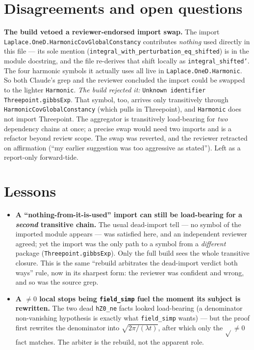 \documentclass[11pt]{article}
\begin{document}
\section{Disagreements and open questions}
\textbf{The build vetoed a reviewer-endorsed import swap.} The import
\texttt{Laplace.OneD.HarmonicCovGlobalConstancy} contributes \emph{nothing} used directly in this file
--- its sole mention (\texttt{integral\_with\_perturbation\_eq\_shifted}) is in the module docstring,
and the file re-derives that shift locally as \texttt{integral\_shifted'}. The four harmonic symbols
it actually uses all live in \texttt{Laplace.OneD.Harmonic}. So both Claude's grep and the reviewer
concluded the import could be swapped to the lighter \texttt{Harmonic}. \emph{The build rejected it:}
\texttt{Unknown identifier Threepoint.gibbsExp}. That symbol, too, arrives only transitively through
\texttt{HarmonicCovGlobalConstancy} (which pulls in Threepoint), and \texttt{Harmonic} does not import
Threepoint. The aggregator is transitively load-bearing for \emph{two} dependency chains at once; a
precise swap would need two imports and is a refactor beyond review scope. The swap was reverted, and
the reviewer retracted on affirmation (``my earlier suggestion was too aggressive as stated''). Left
as a report-only forward-tide.

\section{Lessons}
\begin{itemize}[noitemsep]
  \item \textbf{A ``nothing-from-it-is-used'' import can still be load-bearing for a \emph{second}
    transitive chain.} The usual dead-import tell --- no symbol of the imported module appears --- was
    satisfied here, and an independent reviewer agreed; yet the import was the only path to a symbol
    from a \emph{different} package (\texttt{Threepoint.gibbsExp}). Only the full build sees the whole
    transitive closure. This is the same ``rebuild arbitrates the dead-import verdict both ways''
    rule, now in its sharpest form: the reviewer was confident and wrong, and so was the source grep.
  \item \textbf{A $\ne 0$ local stops being \texttt{field\_simp} fuel the moment its subject is
    rewritten.} The two dead \texttt{hZ0\_ne} facts looked load-bearing (a denominator non-vanishing
    hypothesis is exactly what \texttt{field\_simp} wants) --- but the proof first rewrites the
    denominator into $\sqrt{2\pi/(\lambda t)}$, after which only the $\sqrt{}\ne 0$ fact matches. The
    arbiter is the rebuild, not the apparent role.
\end{itemize}
\end{document}

